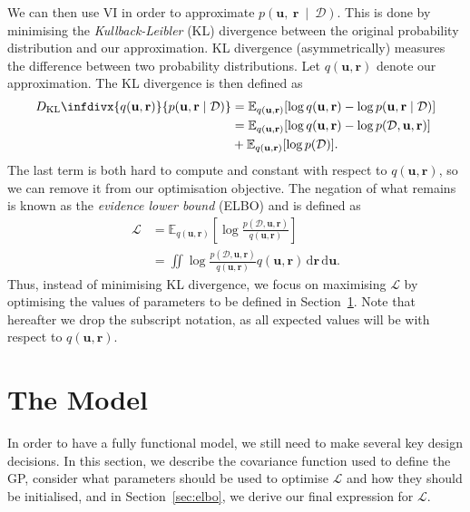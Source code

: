 \documentclass{mpaper}
\newcommand{\DKL}{D_{\mathrm{KL}}\infdivx}
\newcommand{\dx}{\,\mathrm{d}\mathbf{r}\,\mathrm{d}\mathbf{u}}
\newcommand{\pfull}{p(\mathcal{D}, \mathbf{u}, \mathbf{r})}
\newcommand{\approximation}{q(\mathbf{u}, \mathbf{r})}
\newcommand{\posterior}{p(\mathbf{u}, \mathbf{r} \mid \mathcal{D})}
\begin{document}
We can then use VI in order to approximate
$p(\mathbf{u},~\mathbf{r}~\mid~\mathcal{D})$. This is done by minimising the
\emph{Kullback-Leibler} (KL) divergence between the original probability
distribution and our approximation. KL divergence (asymmetrically) measures the
difference between two probability distributions. Let $\approximation$ denote
our approximation. The KL divergence is then defined as
\cite{blei2017variational}
\begin{align*}
  \DKL{\approximation}{\posterior} &= \mathbb{E}_{\approximation}[\log\approximation - \log\posterior ] \\
                                   &= \mathbb{E}_{\approximation}[\log\approximation - \log\pfull] \\
                                   &+ \mathbb{E}_{\approximation}[\log p(\mathcal{D})].
\end{align*}
The last term is both hard to compute and constant with respect to
$\approximation$, so we can remove it from our optimisation objective. The
negation of what remains is known as the \emph{evidence lower bound} (ELBO) and
is defined as \cite{DBLP:books/lib/Bishop07,blei2017variational}
\begin{equation} \label{eq:elbo}
  \begin{split}
    \mathcal{L} &= \mathbb{E}_{\approximation}\left[ \log \frac{\pfull}{\approximation} \right] \\
    &= \iint \log \frac{\pfull}{\approximation} \approximation\dx.
  \end{split}
\end{equation}
Thus, instead of minimising KL divergence, we focus on maximising $\mathcal{L}$
by optimising the values of parameters to be defined in Section~\ref{sec:model}.
Note that hereafter we drop the subscript notation, as all expected values will
be with respect to $\approximation$.

\section{The Model} \label{sec:model}

In order to have a fully functional model, we still need to make several key
design decisions. In this section, we describe the covariance function used to
define the GP, consider what parameters should be used to optimise $\mathcal{L}$
and how they should be initialised, and in Section~\ref{sec:elbo}, we derive our
final expression for $\mathcal{L}$.
\end{document}
